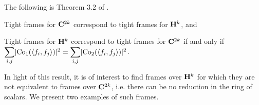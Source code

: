 \documentclass[../../../main]{subfiles}
\begin{document}
The following is Theorem 3.2 of \cite{waldron-quaternions}.

\begin{thm}\label{quaternion-complex-frame-thm}
 \begin{defenum}
  \item Tight frames for $\mathbf{C}^{2k}$ correspond to tight frames for $\mathbf{H}^k$, and
  \item Tight frames for $\mathbf{H}^k$ correspond to tight frames for $\mathbf{C}^{2k}$ if and only if $\ssum_{i,j}\abs{\co(\sharps{f_i,f_j})}^2 = \ssum_{i,j}\abs{\coo(\sharps{f_i,f_j})}^2$.
 \end{defenum}
\end{thm}

In light of this result, it is of interest to find frames over $\mathbf{H}^k$ for which
they are not equivalent to frames over $\mathbf{C}^{2k}$, i.e. there can be no reduction
in the ring of scalars. We present two examples of such frames. 
\end{document}
